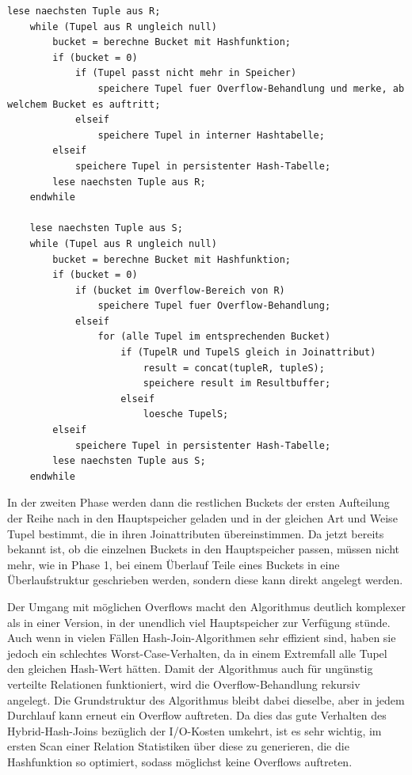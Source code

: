 \documentclass[a4paper,12pt,twoside]{article}
\begin{document}
\begin{minipage}{0.95\textwidth}
	\begin{lstlisting}[caption={Phase 1 Hybrid-Hash-Join.}, label=list:hybrid] 
	lese naechsten Tuple aus R;
	while (Tupel aus R ungleich null) 
		bucket = berechne Bucket mit Hashfunktion;
		if (bucket = 0)
			if (Tupel passt nicht mehr in Speicher)
				speichere Tupel fuer Overflow-Behandlung und merke, ab welchem Bucket es auftritt;
			elseif
				speichere Tupel in interner Hashtabelle;
		elseif
			speichere Tupel in persistenter Hash-Tabelle;
		lese naechsten Tuple aus R;
	endwhile
	
	lese naechsten Tuple aus S;
	while (Tupel aus R ungleich null)
		bucket = berechne Bucket mit Hashfunktion;
		if (bucket = 0)
			if (bucket im Overflow-Bereich von R)
				speichere Tupel fuer Overflow-Behandlung; 
			elseif
				for (alle Tupel im entsprechenden Bucket)
					if (TupelR und TupelS gleich in Joinattribut)
						result = concat(tupleR, tupleS);
						speichere result im Resultbuffer;
					elseif
						loesche TupelS;
		elseif
			speichere Tupel in persistenter Hash-Tabelle;
		lese naechsten Tuple aus S;
	endwhile
	\end{lstlisting}
\end{minipage}

In der zweiten Phase werden dann die restlichen Buckets der ersten Aufteilung der Reihe nach in den Hauptspeicher geladen und in der gleichen Art und Weise Tupel bestimmt, die in ihren Joinattributen übereinstimmen. Da jetzt bereits bekannt ist, ob die einzelnen Buckets in den Hauptspeicher passen, müssen nicht mehr, wie in Phase 1, bei einem Überlauf Teile eines Buckets in eine Überlaufstruktur geschrieben werden, sondern diese kann direkt angelegt werden.

Der Umgang mit möglichen Overflows macht den Algorithmus deutlich komplexer als in einer Version, in der unendlich viel Hauptspeicher zur Verfügung stünde. Auch wenn in vielen Fällen Hash-Join-Algorithmen sehr effizient sind, haben sie jedoch ein schlechtes Worst-Case-Verhalten, da in einem Extremfall alle Tupel den gleichen Hash-Wert hätten. Damit der Algorithmus auch für ungünstig verteilte Relationen funktioniert, wird die Overflow-Behandlung rekursiv angelegt. Die Grundstruktur des Algorithmus bleibt dabei dieselbe, aber in jedem Durchlauf kann erneut ein Overflow auftreten. Da dies das gute Verhalten des Hybrid-Hash-Joins bezüglich der I/O-Kosten umkehrt, ist es sehr wichtig, im ersten Scan einer Relation Statistiken über diese zu generieren, die die Hashfunktion so optimiert, sodass möglichst keine Overflows auftreten.
\end{document}
